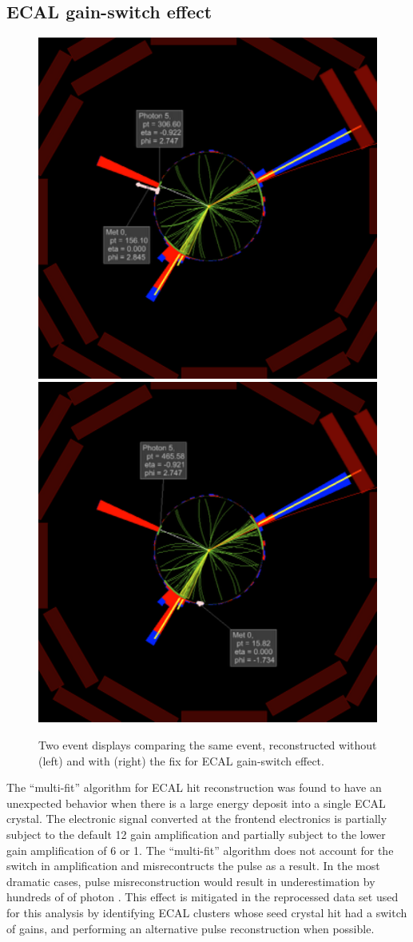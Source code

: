 \subsection{ECAL gain-switch effect}
\label{sec:gainswitch}

\begin{figure}[htbp]
  \centering
  \includegraphics[width=0.48\linewidth]{Reconstruction/Figures/gsfix/evdisp_before.pdf}
  \includegraphics[width=0.48\linewidth]{Reconstruction/Figures/gsfix/evdisp_after.pdf}
  \caption{
    Two event displays comparing the same event, reconstructed without (left) and with (right) the fix for ECAL gain-switch effect.
  }
  \label{fig:eventdisplay_gsfix}
\end{figure}

The ``multi-fit'' algorithm for ECAL hit reconstruction was found to have an unexpected behavior when there is a large energy deposit into a single ECAL crystal.
The electronic signal converted at the frontend electronics is partially subject to the default 12 gain amplification and partially subject to the lower gain amplification of 6 or 1. 
The ``multi-fit'' algorithm does not account for the switch in amplification and misrecontructs the pulse as a result.
In the most dramatic cases, pulse misreconstruction would result in underestimation by hundreds of \GeV of photon \pt. 
This effect is mitigated in the reprocessed data set used for this analysis by identifying ECAL clusters whose seed crystal hit had a switch of gains, and performing an alternative pulse reconstruction when possible.

